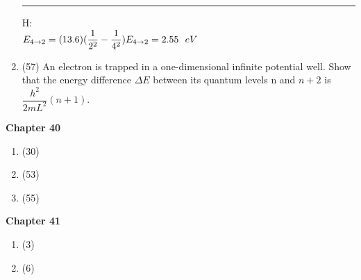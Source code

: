 \documentclass[fleqn]{article}
\begin{document}
\begin{enumerate}
    \textcolor{hwColor}{ 
      \rule{16cm}{0.6pt} 
    } 

    \textcolor{hwColor}{
      H: \\
      $
        E_{4 \rightarrow 2}=(13.6)(\dfrac{1}{2^2}-\dfrac{1}{4^2}) \\
        \\
        E_{4 \rightarrow 2}=2.55 ~~ eV
      $
    }
    
    
    \item (57) An electron is trapped in a one-dimensional infinite potential
    well. Show that the energy difference $\Delta E$ between its quantum levels n and $n+2$ is $\dfrac{h^2}{2mL^2}(n+1)$.

  \end{enumerate}

  \textbf{Chapter 40}
  \begin{enumerate}
    \item (30)


    \item (53)
    
    
    \item (55)
  \end{enumerate}

  \textbf{Chapter 41}
  \begin{enumerate}
    \item (3)


    \item (6)
    
    
  \end{enumerate}
\end{document}
